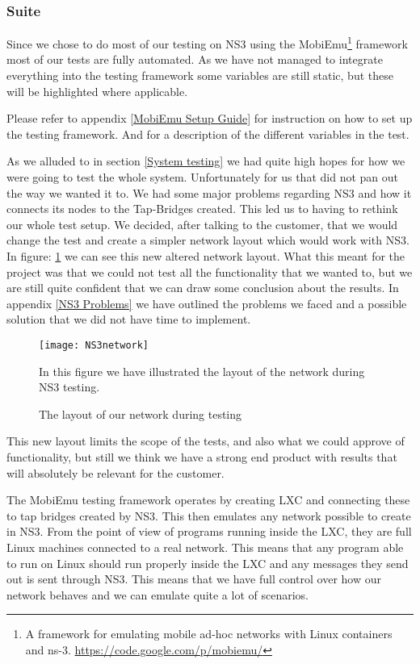 \subsubsection{Suite}\label{Testing:About:Suite}
	Since we chose to do most of our testing on NS3 using the MobiEmu\footnote{A framework for emulating mobile ad-hoc networks with Linux containers and ns-3. \url{https://code.google.com/p/mobiemu/}} framework most of our tests are fully automated. As we have not managed to integrate everything into the testing framework some variables are still static, but these will be highlighted where applicable.

	\begin{shaded}
	Please refer to appendix \ref{MobiEmu Setup Guide} for instruction on how to set up the testing framework. And for a description of the different variables in the test.
	\end{shaded}
	
	As we alluded to in section \ref{System testing} we had quite high hopes for how we were going to test the whole system. Unfortunately for us that did not pan out the way we wanted it to. We had some major problems regarding NS3 and how it connects its nodes to the Tap-Bridges created. This led us to having to rethink our whole test setup. We decided, after talking to the customer, that we would change the test and create a simpler network layout which would work with NS3. In figure: \ref{fig:NS3network} we can see this new altered network layout. What this meant for the project was that we could not test all the functionality that we wanted to, but we are still quite confident that we can draw some conclusion about the results. In appendix \ref{NS3 Problems} we have outlined the problems we faced and a possible solution that we did not have time to implement.
	
	\begin{figure}[H]
        \centering
        \texttt{[image: NS3network]}
        \caption{The layout of our network during testing}
        In this figure we have illustrated the layout of the network during NS3 testing.
        \label{fig:NS3network}
    \end{figure}
    
    This new layout limits the scope of the tests, and also what we could approve of functionality, but still we think we have a strong end product with results that will absolutely be relevant for the customer.
    
    The MobiEmu testing framework operates by creating \gls{LXC} and connecting these to tap bridges created by NS3. This then emulates any network possible to create in NS3. From the point of view of programs running inside the LXC, they are full Linux machines connected to a real network. This means that any program able to run on Linux should run properly inside the LXC and any messages they send out is sent through NS3. This means that we have full control over how our network behaves and we can emulate quite a lot of scenarios.
    
